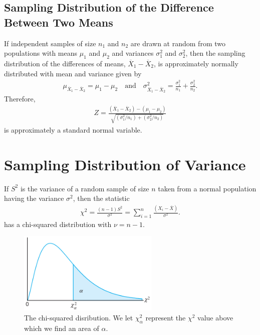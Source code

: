\documentclass[10pt]{article}
\begin{document}
\subsection{Sampling Distribution of the Difference Between Two Means}
\begin{theorem}
    If independent samples of size $n_1$ and $n_2$ are drawn at random from two populations with means $\mu_1$ and $\mu_2$ and variances $\sigma_1^2$ and $\sigma_2^2$, then the sampling distribution of the differences of means, $\overline{X}_1-\overline{X}_2$, is approximately normally distributed with mean and variance given by 
    \begin{gather*}
        \mu_{\overline{X}_1-\overline{X}_2} = \mu_1-\mu_2 \quad \text{and} \quad \sigma_{\overline{X}_1-\overline{X}_2}^2 = \frac{\sigma_1^2}{n_1} + \frac{\sigma_2^2}{n_2}
    .\end{gather*}
    Therefore,
    \begin{gather*}
        Z = \frac{(\overline{X}_1-\overline{X}_2)-(\mu_1-\mu_2)}{\sqrt{(\sigma_1^2 / n_1) + (\sigma_2^2 / n_2)} }
    \end{gather*}
    is approximately a standard normal variable.
\end{theorem}



\section{Sampling Distribution of Variance}
\begin{theorem}
    If $S^2$ is the variance of a random sample of size $n$ taken from a normal population having the variance $\sigma^2$, then the statistic 
    \begin{gather*}
        \chi^2 = \frac{(n-1)S^2}{\sigma^2} = \sum_{i=1}^{n} \frac{(X_i-\overline{X})}{\sigma^2}
    .\end{gather*}
    has a chi-squared distribution with $\nu = n-1$.
\end{theorem}
\begin{figure}[h]
    \centering
    \includegraphics[width=0.6\textwidth]{chiSquaredSampling}
    \caption{The chi-squared disribution. We let $\chi_\alpha^2$ represent the $ \chi^2$ value above which we find an area of $\alpha$.}
    \label{fig:}
\end{figure}
\end{document}
